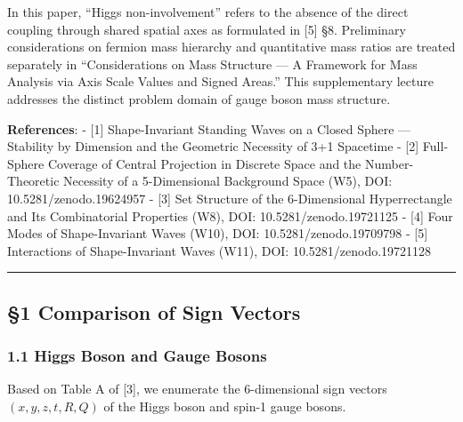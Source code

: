 \documentclass[
  a4paper,11pt]{article}
\theoremstyle{definition}
\theoremstyle{remark}
\begin{document}
In this paper, ``Higgs non-involvement'' refers to the absence of the
direct coupling through shared spatial axes as formulated in {[}5{]} §8.
Preliminary considerations on fermion mass hierarchy and quantitative
mass ratios are treated separately in ``Considerations on Mass Structure
--- A Framework for Mass Analysis via Axis Scale Values and Signed
Areas.'' This supplementary lecture addresses the distinct problem
domain of gauge boson mass structure.

\textbf{References}: - {[}1{]} Shape-Invariant Standing Waves on a
Closed Sphere --- Stability by Dimension and the Geometric Necessity of
3+1 Spacetime - {[}2{]} Full-Sphere Coverage of Central Projection in
Discrete Space and the Number-Theoretic Necessity of a 5-Dimensional
Background Space (W5), DOI: 10.5281/zenodo.19624957 - {[}3{]} Set
Structure of the 6-Dimensional Hyperrectangle and Its Combinatorial
Properties (W8), DOI: 10.5281/zenodo.19721125 - {[}4{]} Four Modes of
Shape-Invariant Waves (W10), DOI: 10.5281/zenodo.19709798 - {[}5{]}
Interactions of Shape-Invariant Waves (W11), DOI:
10.5281/zenodo.19721128

\begin{center}\rule{0.5\linewidth}{0.5pt}\end{center}

\subsection{§1 Comparison of Sign
Vectors}\label{comparison-of-sign-vectors}

\subsubsection{1.1 Higgs Boson and Gauge
Bosons}\label{higgs-boson-and-gauge-bosons}

Based on Table A of {[}3{]}, we enumerate the 6-dimensional sign vectors
\((x, y, z, t, R, Q)\) of the Higgs boson and spin-1 gauge bosons.
\end{document}
